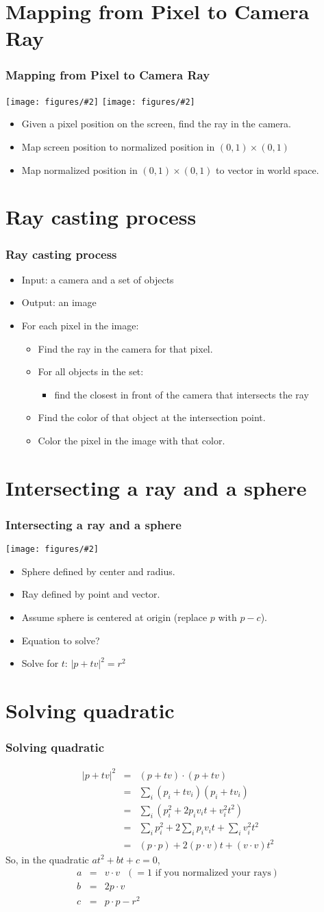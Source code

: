 \documentclass[slidestop,xcolor=pst]{beamer}
\newcommand{\mygraph}[2]{\texttt{[image: figures/\#2]}}
\newcommand{\sect}[1]{
\section{#1}
\begin{frame}[fragile]\frametitle{#1}
}
\newcommand{\bi}{\begin{itemize}}
\newcommand{\ei}{\end{itemize}}
\begin{document}
\sect{Mapping from Pixel to Camera Ray}
\mygraph{.4}{mapping01.png}
\hfill
\mygraph{.5}{mapping02.png}

\begin{itemize}
\item Given a pixel position on the screen, find the ray in the camera.
\item Map screen position to normalized position in $(0,1)\times(0,1)$
\item Map normalized position in $(0,1)\times(0,1)$ to vector in world space.
\end{itemize}
\end{frame}

\sect{Ray casting process}
\bi
\item Input: a camera and a set of objects
\item Output: an image
\item For each pixel in the image:
  \bi
  \item Find the ray in the camera for that pixel.
  \item For all objects in the set:
    \bi
    \item find the closest in front of the camera that intersects the ray
    \ei
  \item Find the color of that object at the intersection point.
  \item Color the pixel in the image with that color.
  \ei
\ei
\end{frame}

\sect{Intersecting a ray and a sphere}
\mygraph{.9}{intersectingraysphere.png}
\begin{itemize}
  \item Sphere defined by center and radius.
\item Ray defined by point and vector.
\item Assume sphere is centered at origin (replace $p$ with $p-c$).
\item Equation to solve?
\pause
\item Solve for $t$:  $|p+tv|^2 = r^2$
\end{itemize}
\end{frame}

\sect{Solving quadratic}
\begin{eqnarray*}
|p+tv|^2 &=& (p+tv)\cdot(p+tv)\\
&=& \sum_i (p_i + tv_i)(p_i + tv_i)\\
&=& \sum_i \left(p_i^2 + 2p_iv_it + v_i^2t^2\right)\\
&=& \sum_i p_i^2 + 2\sum_ip_iv_it + \sum_iv_i^2t^2\\
&=& (p\cdot p) + 2(p\cdot v) t+ (v\cdot v) t^2
\end{eqnarray*}
So, in the quadratic $at^2 + bt + c = 0$,
\begin{eqnarray*}
a &=& v\cdot v \ \ \ (= 1 \mbox{~if you normalized your rays})\\
b &=& 2p\cdot v\\
c &=& p\cdot p - r^2
\end{eqnarray*}
\end{frame}
\end{document}
